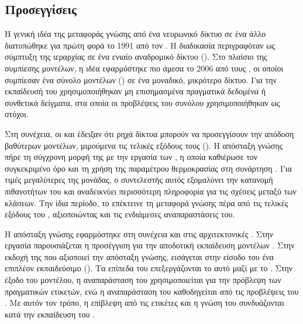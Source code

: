 \subsection{Προσεγγίσεις }
\label{subsec:related-knowledge-distillation}

Η γενική ιδέα της μεταφοράς γνώσης από ένα νευρωνικό δίκτυο σε ένα άλλο
διατυπώθηκε για πρώτη φορά το 1991 από τον 
\cite{schmidhuber1992learning}. Η διαδικασία περιγραφόταν ως σύμπτυξη της ιεραρχίας σε ένα ενιαίο
αναδρομικό δίκτυο (). Στο πλαίσιο της συμπίεσης μοντέλων, η ιδέα εφαρμόστηκε πιο άμεσα το
2006 από τους  \cite{bucilua2006model}, οι
οποίοι συμπίεσαν ένα σύνολο μοντέλων () σε ένα μοναδικό,
μικρότερο δίκτυο. Για την εκπαίδευσή του χρησιμοποιήθηκαν μη
επισημασμένα πραγματικά δεδομένα ή συνθετικά δείγματα, στα οποία οι
προβλέψεις του συνόλου χρησιμοποιήθηκαν ως στόχοι.

Στη συνέχεια, οι  και  \cite{ba2014deep} έδειξαν ότι
ρηχά δίκτυα μπορούν να προσεγγίσουν την απόδοση βαθύτερων μοντέλων,
μιμούμενα τις τελικές εξόδους τους (). Η απόσταξη γνώσης πήρε τη σύγχρονη μορφή της με την εργασία των
 \cite{hinton2015distilling}, η οποία καθιέρωσε τον
συγκεκριμένο όρο και τη χρήση της παραμέτρου θερμοκρασίας στη συνάρτηση
. Για τιμές μεγαλύτερες της μονάδας, ο συντελεστής αυτός
εξομαλύνει την κατανομή πιθανοτήτων του  και αναδεικνύει
περισσότερη πληροφορία για τις σχέσεις μεταξύ των κλάσεων. Την ίδια περίοδο, το 
\cite{romero2015fitnets} επέκτεινε τη μεταφορά γνώσης πέρα από τις
τελικές εξόδους του , αξιοποιώντας και τις ενδιάμεσες
αναπαραστάσεις του.

Η απόσταξη γνώσης εφαρμόστηκε στη συνέχεια και στις αρχιτεκτονικές
. Στην εργασία  \cite{touvron2021deit} παρουσιάζεται η
προσέγγιση  για την αποδοτική εκπαίδευση μοντέλων
. Στην εκδοχή της
που αξιοποιεί την απόσταξη γνώσης, εισάγεται στην είσοδο του  ένα επιπλέον εκπαιδεύσιμο 
(). Τα επίπεδα
του  επεξεργάζονται το  αυτό μαζί με το
. Στην έξοδο του μοντέλου, η αναπαράσταση του
 χρησιμοποιείται για την πρόβλεψη των πραγματικών
ετικετών, ενώ η αναπαράσταση του  καθοδηγείται από
τις προβλέψεις του . Με αυτόν τον τρόπο, η επίβλεψη από τις
ετικέτες και η γνώση του  συνδυάζονται κατά την εκπαίδευση του
.

